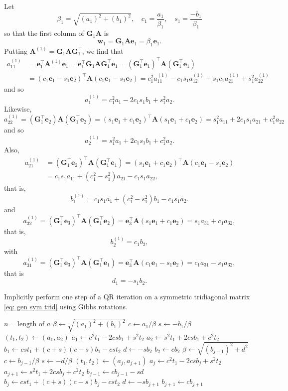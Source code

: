 \documentclass[12pt,a4paper]{article}
\newcommand{\bs}[1]{\boldsymbol{#1}}
\begin{document}
Let
\[
\beta_1=\sqrt{(a_1)^2+(b_1)^2},\quad
c_1=\frac{a_1}{\beta_1},\quad s_1=\frac{-b_1}{\beta_1}
\]
so that the first column of $\bs{G}_1\bs{A}$ is
\[
\bs{w}_1=\bs{G}_1\bs{A}\bs{e}_1=\beta_1\bs{e}_1.
\]
Putting $\bs{A}^{(1)}=\bs{G}_1\bs{A}\bs{G}_1^\top$, we find that
\begin{align*}
a^{(1)}_{11}&=\bs{e}_1^\top\bs{A}^{(1)}\bs{e}_1
	=\bs{e}_1^\top\bs{G}_1\bs{A}\bs{G}_1^\top\bs{e}_1
	=(\bs{G}_1^\top\bs{e}_1)^\top\bs{A}(\bs{G}_1^\top\bs{e}_1)\\
	&=(c_1\bs{e}_1-s_1\bs{e}_2)^\top\bs{A}(c_1\bs{e}_1-s_1\bs{e}_2)
	=c_1^2a^{(1)}_{11}-c_1s_1a^{(1)}_{12}-s_1c_1a^{(1)}_{21}+s_1^2a^{(1)}_{22}
\end{align*}
and so
\[
a^{(1)}_1=c_1^2a_1-2c_1s_1b_1+s_1^2a_2.
\]
Likewise,
\[
a^{(1)}_{22}=(\bs{G}_1^\top\bs{e}_2)\bs{A}(\bs{G}_1^\top\bs{e}_2)
	=(s_1\bs{e}_1+c_1\bs{e}_2)^\top\bs{A}(s_1\bs{e}_1+c_1\bs{e}_2)
	=s_1^2a_{11}+2c_1s_1a_{21}+c_1^2a_{22}
\]
and so
\[
a^{(1)}_2=s_1^2a_1+2c_1s_1b_1+c_1^2a_2.
\]
Also,
\begin{align*}
a^{(1)}_{21}&=(\bs{G}_1^\top\bs{e}_2)^\top\bs{A}(\bs{G}_1^\top\bs{e}_1)
	=(s_1\bs{e}_1+c_1\bs{e}_2)^\top\bs{A}(c_1\bs{e}_1-s_1\bs{e}_2)\\
	&=c_1s_1a_{11}+(c_1^2-s_1^2)a_{21}-c_1s_1a_{22},
\end{align*}
that is,
\[
b^{(1)}_1=c_1s_1a_1+(c_1^2-s_1^2)b_1-c_1s_1a_2.
\]
and
\[
a^{(1)}_{32}=(\bs{G}_1^\top\bs{e}_3)^\top\bs{A}(\bs{G}_1^\top\bs{e}_2)
	=\bs{e}_3^\top\bs{A}(s_1\bs{e}_1+c_1\bs{e}_2)
	=s_1a_{31}+c_1a_{32},
\]
that is,
\[
b^{(1)}_2=c_1b_2,
\]
with
\[
a^{(1)}_{31}=(\bs{G}_1^\top\bs{e}_3)^\top\bs{A}(\bs{G}_1^\top\bs{e}_1)
	=\bs{e}_3^\top\bs{A}(c_1\bs{e}_1-s_1\bs{e}_2)
	=c_1a_{31}-s_1a_{32},
\]
that is
\[
d_1=-s_1b_2.
\]

\begin{algorithm}
\caption{Implicitly perform one step of a QR iteration on a symmetric
tridiagonal matrix \eqref{eq: gen sym trid} using Gibbs rotations.}
\begin{algorithmic}
\Function{implict\_Q\_step}{$\bs{a}$, $\bs{b}$)}
    \State $n=\text{length of $a$}$
    \State $\beta\gets\sqrt{(a_1)^2+(b_1)^2}$
    \State $c\gets a_1/\beta$
    \State $s\gets-b_1/\beta$
    \State $(t_1,t_2)\gets(a_1,a_2)$
    \State $a_1\gets c^2t_1-2csb_1+s^2t_2$
    \State $a_2\gets s^2t_1+2csb_1+c^2t_2$
    \State $b_1\gets cst_1+(c+s)(c-s)b_1-cst_2$
    \State $d\gets -sb_2$
    \State $b_2\gets cb_2$
        \State $\beta\gets\sqrt{(b_{j-1})^2+d^2}$
        \State $c\gets b_{j-1}/\beta$
        \State $s\gets-d/\beta$
        \State $(t_1,t_2)\gets(a_j,a_{j+1})$
        \State $a_j    \gets c^2t_1 - 2csb_j + s^2t_2$
        \State $a_{j+1}\gets s^2t_1 + 2csb_j + c^2t_2$
        \State $b_{j-1}\gets cb_{j-1} - sd$
        \State $b_j    \gets cst_1 + (c+s)(c-s)b_j - cst_2$
  	        \State $d\gets -sb_{j+1}$
            \State $b_{j+1}\gets cb_{j+1}$
        \EndIf
    \EndFor
\EndFunction
\end{algorithmic}
\end{algorithm}
\end{document}

